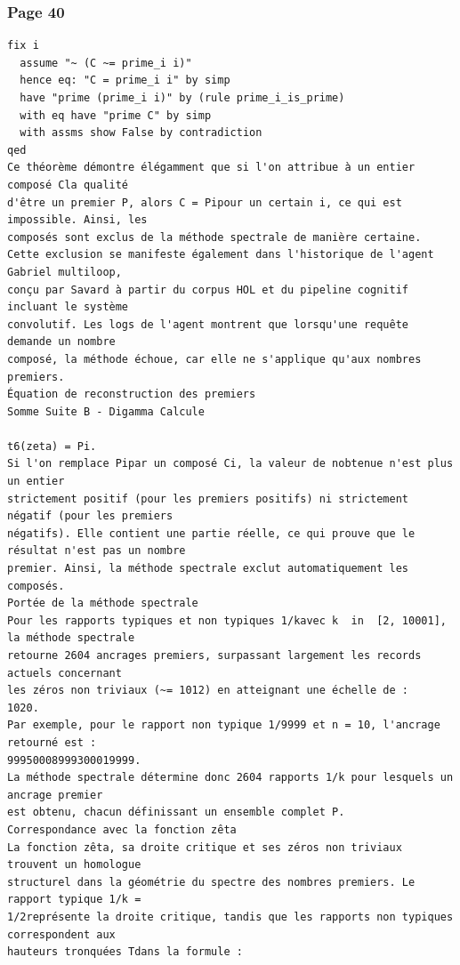 \documentclass[11pt,a4paper]{article}
\begin{document}
\subsubsection*{Page 40}
\begin{Verbatim}[fontsize=\footnotesize]
  fix i 
  assume "~ (C ~= prime_i i)" 
  hence eq: "C = prime_i i" by simp 
  have "prime (prime_i i)" by (rule prime_i_is_prime) 
  with eq have "prime C" by simp 
  with assms show False by contradiction 
qed 
Ce théorème démontre élégamment que si l'on attribue à un entier composé Cla qualité 
d'être un premier P, alors C = Pipour un certain i, ce qui est impossible. Ainsi, les 
composés sont exclus de la méthode spectrale de manière certaine. 
Cette exclusion se manifeste également dans l'historique de l'agent Gabriel multiloop, 
conçu par Savard à partir du corpus HOL et du pipeline cognitif incluant le système 
convolutif. Les logs de l'agent montrent que lorsqu'une requête demande un nombre 
composé, la méthode échoue, car elle ne s'applique qu'aux nombres premiers. 
Équation de reconstruction des premiers 
Somme Suite B - Digamma Calcule

t6(zeta) = Pi. 
Si l'on remplace Pipar un composé Ci, la valeur de nobtenue n'est plus un entier 
strictement positif (pour les premiers positifs) ni strictement négatif (pour les premiers 
négatifs). Elle contient une partie réelle, ce qui prouve que le résultat n'est pas un nombre 
premier. Ainsi, la méthode spectrale exclut automatiquement les composés. 
Portée de la méthode spectrale 
Pour les rapports typiques et non typiques 1/kavec k  in  [2, 10001], la méthode spectrale 
retourne 2604 ancrages premiers, surpassant largement les records actuels concernant 
les zéros non triviaux (~= 1012) en atteignant une échelle de : 
1020. 
Par exemple, pour le rapport non typique 1/9999 et n = 10, l'ancrage retourné est :
99950008999300019999. 
La méthode spectrale détermine donc 2604 rapports 1/k pour lesquels un ancrage premier 
est obtenu, chacun définissant un ensemble complet P. 
Correspondance avec la fonction zêta 
La fonction zêta, sa droite critique et ses zéros non triviaux trouvent un homologue 
structurel dans la géométrie du spectre des nombres premiers. Le rapport typique 1/k =
1/2représente la droite critique, tandis que les rapports non typiques correspondent aux 
hauteurs tronquées Tdans la formule : 
\end{Verbatim}
\medskip
\end{document}
